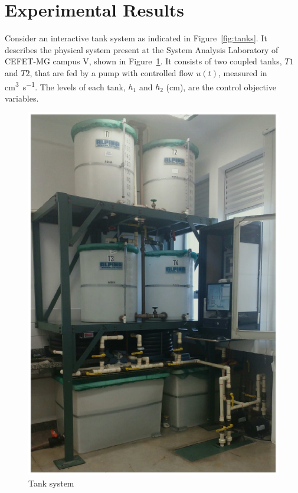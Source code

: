\section{Experimental Results}%
\label{sec:experimental-results}

Consider an interactive tank system as indicated in Figure~\ref{fig:tanks}. It
describes the physical system present at the System Analysis Laboratory of
CEFET-MG campus V, shown in Figure~\ref{fig:tanks-real}. It consists of two
coupled tanks, \(T1\) and \(T2\), that are fed by a pump with controlled flow
\(u(t)\), measured in \si{\cubic\centi\metre\per\second}. The levels of each
tank, \(h_1\) and \(h_2\) (\si{\centi\metre}), are the control objective
variables.

\begin{figure}[ht!]
  \centering \captionsetup{justification=centering}
  \includegraphics[height=.5\textheight]{imgs/tanks-real}
  \caption{Tank system}%
  \label{fig:tanks-real}
\end{figure}

